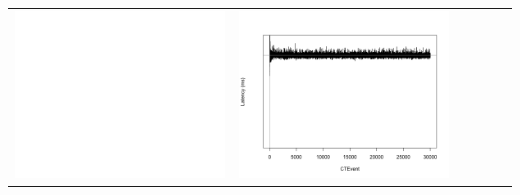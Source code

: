 \begin{table}[htbp]
{\begin{tabular}{l | ccccc}
\begin{minipage}{.15\textwidth}
				\vspace{2pt}
     			 	\includegraphics[width=\linewidth]{images/lat-log-graph/N5}
    				 \end{minipage}
    			   &	 \begin{minipage}{.15\textwidth}
     			 	
				\vspace{2pt}
     			 	\includegraphics[width=\linewidth]{images/lat-log-graph/N9}
    				 \end{minipage}
    			   &	 \begin{minipage}{.15\textwidth}
     			 	

\end{minipage}
\end{tabular}}
\end{table}

